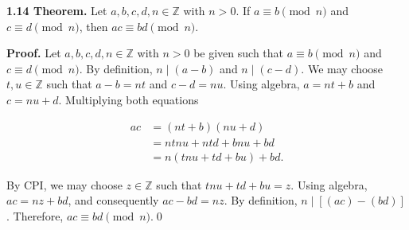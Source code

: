 \documentclass[12pt]{article}
\begin{document}
\noindent\textbf{1.14 Theorem.} Let $a,b,c,d,n\in\mathbb{Z}$ with $n>0$. If $a\equiv b\pmod{n}$ and $c\equiv d\pmod{n}$, then $ac\equiv bd\pmod{n}$.

\bigskip

\noindent\textbf{Proof.} Let $a,b,c,d,n\in\mathbb{Z}$ with $n>0$ be given such that $a\equiv b\pmod{n}$ and $c\equiv d\pmod{n}$. By definition, $n\mid(a-b)$ and $n\mid(c-d)$. We may choose $t,u \in \mathbb{Z}$ such that $a-b=nt$ and $c-d=nu$. Using algebra, $a=nt+b$ and $c=nu+d$. Multiplying both equations

\begin{align*}
ac &= (nt+b)(nu+d) \\
   &= ntnu+ntd+bnu+bd \\
	 &= n(tnu+td+bu)+bd.
\end{align*}

\noindent By CPI, we may choose $z\in\mathbb{Z}$ such that $tnu+td+bu=z$. Using algebra, $ac=nz+bd$, and consequently $ac-bd=nz$. By definition, $n\mid[(ac)-(bd)]$. Therefore, $ac\equiv bd\pmod{n}$.\qed
\end{document}
